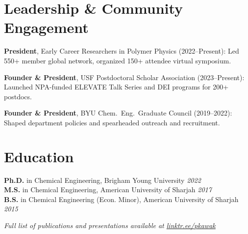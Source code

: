 \documentclass[letterpaper,12pt]{article}
\begin{document}
\vspace{-0.3\baselineskip}
\section*{Leadership \& Community Engagement}
\begin{tabitemize}[leftmargin=*]
  \item \textbf{President}, Early Career Researchers in Polymer Physics (2022–Present): Led 550+ member global network, organized 150+ attendee virtual symposium.
  \item \textbf{Founder \& President}, USF Postdoctoral Scholar Association (2023–Present): Launched NPA-funded ELEVATE Talk Series and DEI programs for 200+ postdocs.
  \item \textbf{Founder \& President}, BYU Chem.~Eng.~Graduate Council (2019–2022): Shaped department policies and spearheaded outreach and recruitment.
\end{tabitemize}

\vspace{-0.3\baselineskip}
\begin{refsection}[articles]
  \nocite{*}
  \setlength\bibitemsep{0pt}
  \printbibliography[resetnumbers=true,type=article,title={Selected Peer-Reviewed Publications},heading=fix]
\end{refsection}

\vspace{-0.3\baselineskip}
\section*{Education}
\textbf{Ph.D.} in Chemical Engineering, Brigham Young University \hfill \textit{2022} \\
\textbf{M.S.} in Chemical Engineering, American University of Sharjah \hfill \textit{2017} \\
\textbf{B.S.} in Chemical Engineering (Econ. Minor), American University of Sharjah \hfill \textit{2015}

\vspace{0.5em}
\noindent\textit{Full list of publications and presentations available at \href{https://linktr.ee/pkawak}{linktr.ee/pkawak}}
\end{document}
